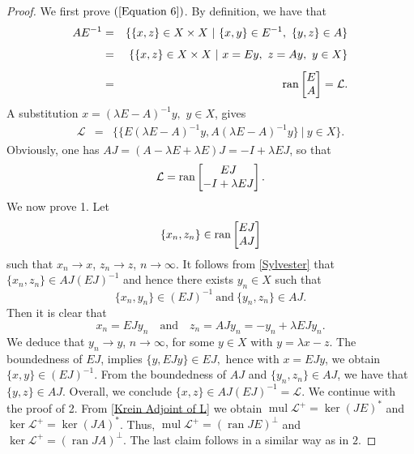 \documentclass{birkjour}
\theoremstyle{definition}
\theoremstyle{remark}
\numberwithin{equation}{section}
\newcommand{\Ll}{\mathcal L}
\DeclareMathOperator{\ran}{ran}
\DeclareMathOperator{\mul}{mul}
\begin{document}
\begin{proof}
 We first prove $(\ref{Equation 6})$. By definition, we have that
 \begin{eqnarray}  \nonumber
 AE^{-1}&=& \{\{x,z\} \in X \times X ~|~ \{x,y\}\in E^{-1}, ~ \{y,z\} \in A \} \\[1ex]\label{Sylvester}
 &=& \{\{x,z\} \in X \times X ~|~  x=E y, ~ z= Ay, \ y \in X \} \\[1ex]\nonumber
 &=&  \textup{ran}\begin{bmatrix}
			E\\ A
			\end{bmatrix} = \mathcal{L}.
 \end{eqnarray}
 A substitution $x=(\lambda E-A)^{-1}y,$ $y\in X$, gives
  \begin{eqnarray*}\mathcal{L}&=& \{\{E(\lambda E-A)^{-1}y,A(\lambda E-A)^{-1}y\} ~|~  y\in X\} .
 \end{eqnarray*} 
 Obviously, one has $AJ=(A-\lambda E+\lambda E)J=-I+\lambda EJ$, so that  
 $$
        \mathcal{L}=  \textup{ran}\begin{bmatrix}
			EJ\\ -I+\lambda EJ
			\end{bmatrix}.
   $$ 
We now prove 1. Let 
$$
\{x_{n},z_{n}\}\in \textup{ran}
\begin{bmatrix}
			EJ\\ AJ
			\end{bmatrix}
$$
such that $x_{n}\rightarrow x$, $z_{n}\rightarrow z$, $n\rightarrow \infty$. It follows from \eqref{Sylvester} that $\{x_{n},z_{n}\}\in AJ(EJ)^{-1}$ and hence there exists $y_{n}\in X$ such that 
$$
\{x_{n},y_{n}\}\in (EJ)^{-1} \ \text{and}\ \{y_{n},z_{n}\}\in AJ.
$$
Then it is clear that 
$$
x_{n}=E Jy_{n}\quad  \mbox{and}\quad  z_{n}=A Jy_{n}=-y_{n}+\lambda EJy_{n}.
$$
We deduce that $y_{n}\rightarrow y$, $n\rightarrow \infty$, for some $y\in X$ with $y=\lambda x-z$.
The boundedness of $EJ$, implies  $\{y,EJy\}\in EJ,$ hence with $x=EJy$, we obtain $\{x,y\}\in(EJ)^{-1}$. From the boundedness of $AJ$ and $\{y_{n},z_{n}\}\in AJ $, we have that $\{y,z\}\in AJ.$ Overall, we conclude $\{x,z\}\in AJ(EJ)^{-1}=\mathcal{L}$. We continue with the proof of 2. From \eqref{Krein Adjoint of L} we obtain $\mul\Ll^+= \ker (JE)^*$ and $\ker\Ll^+= \ker (JA)^* $. Thus,  $\mul\Ll^+= (\ran JE) ^\perp$ and $\ker\Ll^+= (\ran JA) ^\perp$. The last claim follows in a similar way as in $2$.
\end{proof}
\end{document}
